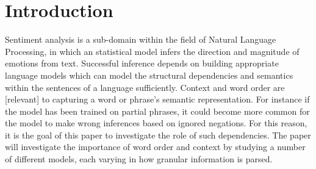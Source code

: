 \section{Introduction}
\label{sec: intro}
Sentiment analysis is a sub-domain within the field of Natural Language
Processing, in which an statistical model infers the direction and magnitude of
emotions from text. Successful inference depends on building appropriate
language models which can model the structural dependencies and semantics within
the sentences of a language sufficiently. Context and word order are [relevant]
to capturing a word or phrase's semantic representation. For instance if the
model has been trained on partial phrases, it could become more common for the
model to make wrong inferences based on ignored negations. For this reason, it
is the goal of this paper to investigate the role of such dependencies. The
paper will investigate the importance of word order and context by studying a
number of different models, each varying in how granular information is parsed.
